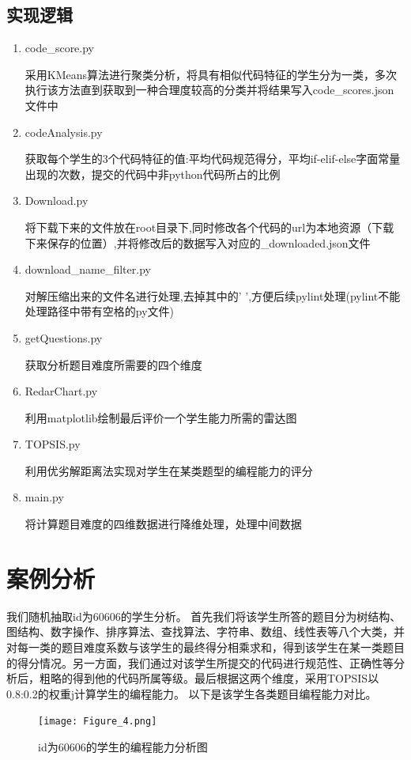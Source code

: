 \documentclass[UTF8]{ctexart}
\begin{document}
	\subsection{实现逻辑}
	\begin{enumerate}
		\item code\_score.py
		\par 采用KMeans算法进行聚类分析，将具有相似代码特征的学生分为一类，多次执行该方法直到获取到一种合理度较高的分类并将结果写入code\_scores.json文件中
		\item codeAnalysis.py
		\par 获取每个学生的3个代码特征的值:平均代码规范得分，平均if-elif-else字面常量出现的次数，提交的代码中非python代码所占的比例
		\item Download.py
		\par 将下载下来的文件放在root目录下,同时修改各个代码的url为本地资源（下载下来保存的位置）,并将修改后的数据写入对应的\_downloaded.json文件
		\item download\_name\_filter.py
		\par 对解压缩出来的文件名进行处理,去掉其中的' ',方便后续pylint处理(pylint不能处理路径中带有空格的py文件)
		\item getQuestions.py
		\par 获取分析题目难度所需要的四个维度
		\item RedarChart.py
		\par 利用matplotlib绘制最后评价一个学生能力所需的雷达图
		\item TOPSIS.py
		\par 利用优劣解距离法实现对学生在某类题型的编程能力的评分
		\item main.py
		\par 将计算题目难度的四维数据进行降维处理，处理中间数据
	\end{enumerate}
	
	
	\section{案例分析}\label{sec4}
	我们随机抽取id为60606的学生分析。
	首先我们将该学生所答的题目分为树结构、图结构、数字操作、排序算法、查找算法、字符串、数组、线性表等八个大类，并对每一类的题目难度系数与该学生的最终得分相乘求和，得到该学生在某一类题目的得分情况。另一方面，我们通过对该学生所提交的代码进行规范性、正确性等分析后，粗略的得到他的代码所属等级。最后根据这两个维度，采用TOPSIS以0.8:0.2的权重j计算学生的编程能力。
	以下是该学生各类题目编程能力对比。
	\begin{figure}[!htbp]
		\centering
		\texttt{[image: Figure\_4.png]}\\
		\caption{id为60606的学生的编程能力分析图}
	\end{figure}
	
\end{document}
